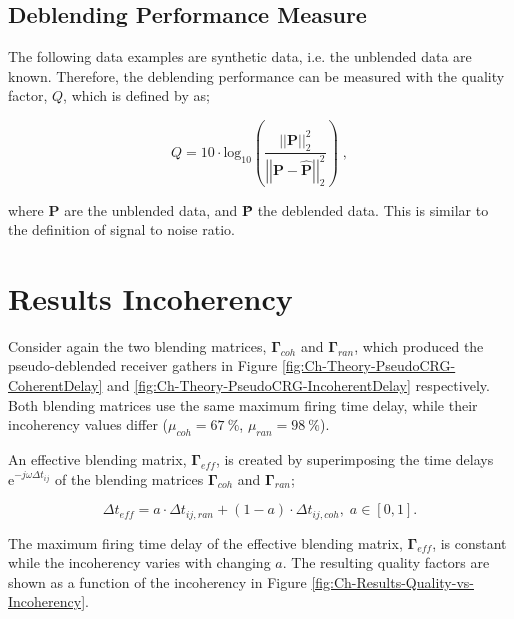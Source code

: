 \subsection*{Deblending Performance Measure}

The following data examples are synthetic data, i.e. the unblended data are known. Therefore, the deblending performance can be measured with the quality factor, $Q$, which is defined by \citet{IbrahimQuality} as;

\begin{equation}
	Q = 10 \cdot \mathrm{log_{10}} \left( \frac{\left|\left|\mathbf{P}\right|\right| _2 ^2}{\left|\left|\mathbf{P - \hat{P}}\right|\right| _2 ^2} \right) \;,	
\end{equation}

where $\mathbf{P}$ are the unblended data, and \textbf{\^{P}} the deblended data. This is similar to the definition of signal to noise ratio. 





\section{Results Incoherency}

Consider again the two blending matrices, $\mathbf{\Gamma}_{coh}$ and $\mathbf{\Gamma}_{ran}$, which produced the pseudo-deblended receiver gathers in Figure \ref{fig:Ch-Theory-PseudoCRG-CoherentDelay} and \ref{fig:Ch-Theory-PseudoCRG-IncoherentDelay} respectively. Both blending matrices use the same maximum firing time delay, while their incoherency values differ ($\mu_{coh} = \SI{67}{\percent}$, $\mu_{ran} = \SI{98}{\percent}$). 

An effective blending matrix, $\mathbf{\Gamma}_{eff}$, is created by superimposing the time delays $\mathrm{e}^{-j \omega \Delta t_{ij}}$ of the blending matrices $\mathbf{\Gamma}_{coh}$ and $\mathbf{\Gamma}_{ran}$;

\begin{equation}
	\Delta t_{eff} = a \cdot \Delta t_{ij,ran} + (1 - a) \cdot \Delta t_{ij,coh}, \; a \in [0,1].
	\label{eq:Ch-Incoherency-EffectiveG}
\end{equation}

The maximum firing time delay of the effective blending matrix, $\mathbf{\Gamma}_{eff}$, is constant while the incoherency  varies with changing $a$. The resulting quality factors are shown as a function of the incoherency in Figure \ref{fig:Ch-Results-Quality-vs-Incoherency}.


